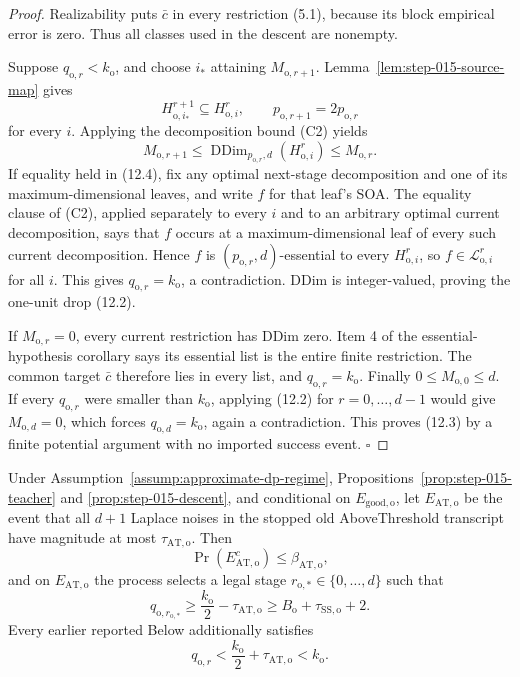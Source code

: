 \begin{proof}
Realizability puts \(\bar c\) in every restriction (5.1), because its
block empirical error is zero. Thus all classes used in the descent are
nonempty.

Suppose \(q_{\mathrm o,r}<k_{\mathrm o}\), and choose \(i_*\) attaining
\(M_{\mathrm o,r+1}\). Lemma~\ref{lem:step-015-source-map} gives
\[
H_{\mathrm o,i_*}^{r+1}\subseteq H_{\mathrm o,i}^{r},
\qquad
p_{\mathrm o,r+1}=2p_{\mathrm o,r}
\]
for every \(i\). Applying the decomposition bound (C2) yields
\[
M_{\mathrm o,r+1}
\le\operatorname{DDim}_{p_{\mathrm o,r},d}
(H_{\mathrm o,i}^r)
\le M_{\mathrm o,r}.
\tag{12.4}
\]
If equality held in (12.4), fix any optimal next-stage decomposition and
one of its maximum-dimensional leaves, and write \(f\) for that leaf's
SOA. The equality clause of (C2), applied separately to every \(i\) and
to an arbitrary optimal current decomposition, says that \(f\) occurs at a
maximum-dimensional leaf of every such current decomposition. Hence \(f\)
is \((p_{\mathrm o,r},d)\)-essential to every
\(H_{\mathrm o,i}^r\), so \(f\in\mathcal L_{\mathrm o,i}^r\) for all
\(i\). This gives \(q_{\mathrm o,r}=k_{\mathrm o}\), a contradiction.
DDim is integer-valued, proving the one-unit drop (12.2).

If \(M_{\mathrm o,r}=0\), every current restriction has DDim zero. Item 4
of the essential-hypothesis corollary says its essential list is
the entire finite restriction. The common target \(\bar c\) therefore lies
in every list, and \(q_{\mathrm o,r}=k_{\mathrm o}\).
Finally \(0\le M_{\mathrm o,0}\le d\). If every
\(q_{\mathrm o,r}\) were smaller than \(k_{\mathrm o}\), applying (12.2)
for \(r=0,\ldots,d-1\) would give \(M_{\mathrm o,d}=0\), which forces
\(q_{\mathrm o,d}=k_{\mathrm o}\), again a contradiction. This proves
(12.3) by a finite potential argument with no imported success event.
\(\square\)


\end{proof}

\begin{lemma}\label{lem:step-015-at}
Under Assumption~\ref{assump:approximate-dp-regime},
Propositions~\ref{prop:step-015-teacher} and
\ref{prop:step-015-descent}, and conditional on
\(E_{\mathrm{good,o}}\), let \(E_{\mathrm{AT,o}}\) be the event that all
\(d+1\) Laplace noises in the stopped old AboveThreshold transcript have
magnitude at most \(\tau_{\mathrm{AT,o}}\). Then
\[
\Pr(E_{\mathrm{AT,o}}^c)\le\beta_{\mathrm{AT,o}},
\tag{13.1}
\]
and on \(E_{\mathrm{AT,o}}\) the process selects a legal stage
\(r_{\mathrm o,*}\in\{0,\ldots,d\}\) such that
\[
q_{\mathrm o,r_{\mathrm o,*}}
\ge\frac{k_{\mathrm o}}2-\tau_{\mathrm{AT,o}}
\ge B_{\mathrm o}+\tau_{\mathrm{SS,o}}+2.
\tag{13.2}
\]
Every earlier reported Below additionally satisfies
\[
q_{\mathrm o,r}<\frac{k_{\mathrm o}}2+\tau_{\mathrm{AT,o}}
<k_{\mathrm o}.
\tag{13.3}
\]


\end{lemma}


